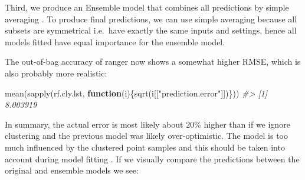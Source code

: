 \documentclass[
  graybox,natbib,nospthms]{svmono}
\newenvironment{Shaded}{\begin{snugshade}}{\end{snugshade}}
\newcommand{\AttributeTok}[1]{\textcolor[rgb]{0.61,0.61,0.61}{#1}}
\newcommand{\CommentTok}[1]{\textcolor[rgb]{0.37,0.37,0.37}{\textit{#1}}}
\newcommand{\ConstantTok}[1]{\textcolor[rgb]{0,0,0}{#1}}
\newcommand{\ControlFlowTok}[1]{\textcolor[rgb]{0.27,0.27,0.27}{\textbf{#1}}}
\newcommand{\FunctionTok}[1]{\textcolor[rgb]{0,0,0}{#1}}
\newcommand{\NormalTok}[1]{#1}
\newcommand{\OtherTok}[1]{\textcolor[rgb]{0.37,0.37,0.37}{#1}}
\newcommand{\SpecialCharTok}[1]{\textcolor[rgb]{0,0,0}{#1}}
\newcommand{\StringTok}[1]{\textcolor[rgb]{0.5,0.5,0.5}{#1}}
\begin{document}
Third, we produce an Ensemble model that combines all predictions by simple
averaging \citep{wright2017ranger}. To produce final predictions, we can use
simple averaging because all subsets are symmetrical i.e.~have exactly the same
inputs and settings, hence all models fitted have equal importance for the ensemble model.

The out-of-bag accuracy of ranger now shows a somewhat higher RMSE, which is also
probably more realistic:

\begin{Shaded}
\begin{Highlighting}[]
\FunctionTok{mean}\NormalTok{(}\FunctionTok{sapply}\NormalTok{(rf.cly.lst, }\ControlFlowTok{function}\NormalTok{(i)\{}\FunctionTok{sqrt}\NormalTok{(i[[}\StringTok{"prediction.error"}\NormalTok{]])\}))}
\CommentTok{\#\textgreater{} [1] 8.003919}
\end{Highlighting}
\end{Shaded}

In summary, the actual error is most likely about 20\% higher than if we ignore
clustering and the previous model was likely over-optimistic. The model is too
much influenced by the clustered point samples and this should be taken into
account during model fitting \citep{roberts2017cross, meyer2021predicting}. If we
visually compare the predictions between the original and ensemble models we see:

\begin{Shaded}
\end{Shaded}
\end{document}
